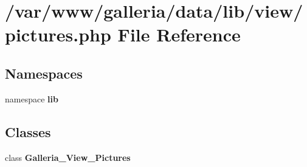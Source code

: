 \section{/var/www/galleria/data/lib/view/pictures.php File Reference}
\label{pictures_8php}
\subsection*{Namespaces}
\begin{CompactItemize}
\item 
namespace {\bf lib}
\end{CompactItemize}
\subsection*{Classes}
\begin{CompactItemize}
\item 
class {\bf Galleria\_\-View\_\-Pictures}
\end{CompactItemize}

